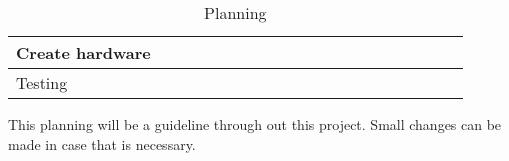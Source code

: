 \begin{table}[!h]
{\begin{tabular}{l|l|l|l|l|l|l|l|l|l|l|l|l|l|l|l|l|l|l|l|}
             \multicolumn{1}{|l|}{\cellcolor{cyan}Create hardware}          &&&&&&&&&&&&\cellcolor{orange}&\cellcolor{orange}&\cellcolor{orange}&\cellcolor{orange}&\cellcolor{orange}&\cellcolor{orange}&\cellcolor{orange}&  \\ \hline
             \multicolumn{1}{|l|}{\cellcolor{cyan}Testing}                  &&&&&&&&&&&&&&&&&&\cellcolor{orange}&\cellcolor{orange}  \\ \hline
            \end{tabular}
        }
        \caption{Planning}
        \end{table}
    
\par
\bigskip
\noindent
This planning will be a guideline through out this project. Small changes can be made in case that is necessary.